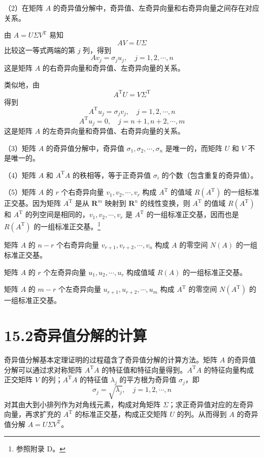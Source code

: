 \documentclass[UTF8,12pt,a4paper,fontset=fandol]{ctexart}
\begin{document}
（2）在矩阵 $A$ 的奇异值分解中，奇异值、左奇异向量和右奇异向量之间存在对应关系。

由 $A=U\Sigma V^{\mathrm{T}}$ 易知
\[
AV=U\Sigma
\]
比较这一等式两端的第 $j$ 列，得到
\begin{equation}
Av_j=\sigma_ju_j,\quad j=1,2,\cdots,n
\tag{15.22}
\end{equation}
这是矩阵 $A$ 的右奇异向量和奇异值、左奇异向量的关系。

类似地，由
\[
A^{\mathrm{T}}U=V\Sigma^{\mathrm{T}}
\]
得到
\begin{equation}
A^{\mathrm{T}}u_j=\sigma_jv_j,\quad j=1,2,\cdots,n
\tag{15.23}
\end{equation}
\begin{equation}
A^{\mathrm{T}}u_j=0,\quad j=n+1,n+2,\cdots,m
\tag{15.24}
\end{equation}
这是矩阵 $A$ 的左奇异向量和奇异值、右奇异向量的关系。

（3）矩阵 $A$ 的奇异值分解中，奇异值 $\sigma_1,\sigma_2,\cdots,\sigma_n$ 是唯一的，而矩阵 $U$ 和 $V$ 不是唯一的。

（4）矩阵 $A$ 和 $A^{\mathrm{T}}A$ 的秩相等，等于正奇异值 $\sigma_i$ 的个数（包含重复的奇异值）。

（5）矩阵 $A$ 的 $r$ 个右奇异向量 $v_1,v_2,\cdots,v_r$ 构成 $A^{\mathrm{T}}$ 的值域 $R(A^{\mathrm{T}})$ 的一组标准正交基。因为矩阵 $A^{\mathrm{T}}$ 是从 $\mathbf{R}^m$ 映射到 $\mathbf{R}^n$ 的线性变换，则 $A^{\mathrm{T}}$ 的值域 $R(A^{\mathrm{T}})$ 和 $A^{\mathrm{T}}$ 的列空间是相同的，$v_1,v_2,\cdots,v_r$ 是 $A^{\mathrm{T}}$ 的一组标准正交基，因而也是 $R(A^{\mathrm{T}})$ 的一组标准正交基。\footnote{参照附录 D。}

矩阵 $A$ 的 $n-r$ 个右奇异向量 $v_{r+1},v_{r+2},\cdots,v_n$ 构成 $A$ 的零空间 $N(A)$ 的一组标准正交基。

矩阵 $A$ 的 $r$ 个左奇异向量 $u_1,u_2,\cdots,u_r$ 构成值域 $R(A)$ 的一组标准正交基。

矩阵 $A$ 的 $m-r$ 个左奇异向量 $u_{r+1},u_{r+2},\cdots,u_m$ 构成 $A^{\mathrm{T}}$ 的零空间 $N(A^{\mathrm{T}})$ 的一组标准正交基。

\section*{15.2\quad 奇异值分解的计算}

奇异值分解基本定理证明的过程蕴含了奇异值分解的计算方法。矩阵 $A$ 的奇异值分解可以通过求对称矩阵 $A^{\mathrm{T}}A$ 的特征值和特征向量得到。$A^{\mathrm{T}}A$ 的特征向量构成正交矩阵 $V$ 的列；$A^{\mathrm{T}}A$ 的特征值 $\lambda_j$ 的平方根为奇异值 $\sigma_j$，即
\[
\sigma_j=\sqrt{\lambda_j},\quad j=1,2,\cdots,n
\]
对其由大到小排列作为对角线元素，构成对角矩阵 $\Sigma$；求正奇异值对应的左奇异向量，再求扩充的 $A^{\mathrm{T}}$ 的标准正交基，构成正交矩阵 $U$ 的列。从而得到 $A$ 的奇异值分解 $A=U\Sigma V^{\mathrm{T}}$。
\end{document}
